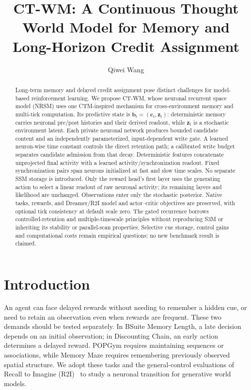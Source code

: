 \documentclass{article}
\title{CT-WM: A Continuous Thought World Model for Memory and Long-Horizon Credit Assignment}
\author{
Qiwei Wang
}
\begin{document}
\maketitle

\begin{abstract}
Long-term memory and delayed credit assignment pose distinct challenges for model-based reinforcement learning. We propose CT-WM, whose neuronal recurrent space model (NRSM) uses one CTM-inspired mechanism for cross-environment memory and multi-tick computation. Its predictive state is $\mathbf b_t=(\mathbf c_t,\mathbf z_t)$: deterministic memory carries neuronal pre/post histories and their derived readout, while $\mathbf z_t$ is a stochastic environment latent. Each private neuronal network produces bounded candidate content and an independently parameterized, input-dependent write gate. A learned neuron-wise time constant controls the direct retention path; a calibrated write budget separates candidate admission from that decay. Deterministic features concatenate unprojected final activity with a learned activity/synchronization readout. Fixed synchronization pairs span neurons initialized at fast and slow time scales. No separate SSM storage is introduced. Only the reward head's first layer uses the generating action to select a linear readout of raw neuronal activity; its remaining layers and likelihood are unchanged. Observations enter only the stochastic posterior. Native tasks, rewards, and Dreamer/R2I model and actor--critic objectives are preserved, with optional tick consistency at default scale zero. The gated recurrence borrows controlled-retention and multiple-timescale principles without reproducing S3M or inheriting its stability or parallel-scan properties. Selective cue storage, control gains and computational costs remain empirical questions; no new benchmark result is claimed.
\end{abstract}

\section{Introduction}

An agent can face delayed rewards without needing to remember a hidden cue, or need to retain an observation even when rewards are frequent. These two demands should be tested separately. In BSuite Memory Length, a late decision depends on an initial observation; in Discounting Chain, an early action determines a delayed reward. POPGym requires maintaining sequences or associations, while Memory Maze requires remembering previously observed spatial structure. We adopt these tasks and the general-control evaluations of Recall to Imagine (R2I)~\cite{samsami2024mastering} to study a neuronal transition for generative world models.
\end{document}
